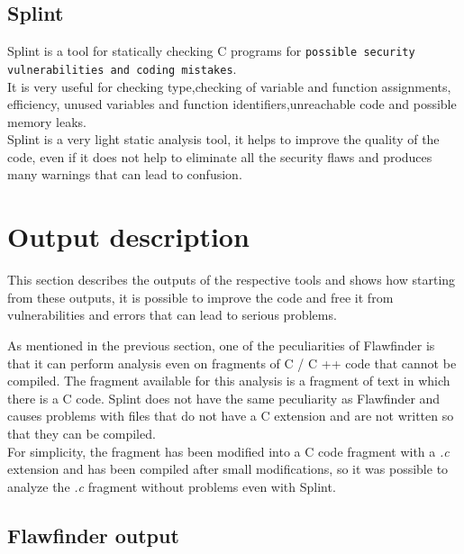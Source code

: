 \documentclass[a4paper,12pt]{article}
\newenvironment{SpecialPar}
  {\begin{shaded}}
  {\end{shaded}}
\begin{document}
\subsection{Splint}
Splint is a tool for statically checking C programs for \texttt{possible security vulnerabilities and coding mistakes}.\cite{splint}\\
It is very useful for checking type,checking of variable and function assignments, efficiency, unused variables and function identifiers,unreachable code and possible memory leaks.\\
Splint is a very light static analysis tool, it helps to improve the quality of the code, even if it does not help to eliminate all the security flaws and produces many warnings that can lead to confusion\cite{splint2}.



\newpage
\section{Output description}
This section describes the outputs of the respective tools and shows how starting from these outputs, it is possible to improve the code and free it from vulnerabilities and errors that can lead to serious problems.
\begin{SpecialPar}
\noindent
As mentioned in the previous section, one of the peculiarities of Flawfinder is that it can perform analysis even on fragments of C / C ++ code that cannot be compiled.
The fragment available for this analysis is a fragment of text in which there is a C code.
Splint does not have the same peculiarity as Flawfinder and causes problems with files that do not have a C extension and are not written so that they can be compiled.\\
For simplicity, the fragment has been modified into a C code fragment with a \textit{.c} extension and has been compiled after small modifications, so it was possible to analyze the \textit{.c} fragment without problems even with Splint.
\end{SpecialPar}




\subsection{Flawfinder output}
\end{document}
